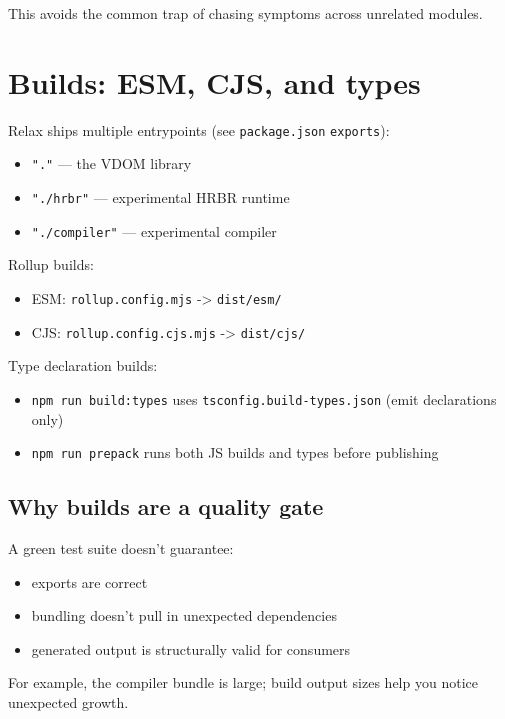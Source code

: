 This avoids the common trap of chasing symptoms across unrelated modules.

\section{Builds: ESM, CJS, and types}

Relax ships multiple entrypoints (see \texttt{package.json} \texttt{exports}):

\begin{itemize}
\item \texttt{"."} --- the VDOM library
\item \texttt{"./hrbr"} --- experimental HRBR runtime
\item \texttt{"./compiler"} --- experimental compiler
\end{itemize}

Rollup builds:

\begin{itemize}
\item ESM: \texttt{rollup.config.mjs} -> \texttt{dist/esm/}
\item CJS: \texttt{rollup.config.cjs.mjs} -> \texttt{dist/cjs/}
\end{itemize}

Type declaration builds:

\begin{itemize}
\item \texttt{npm run build:types} uses \texttt{tsconfig.build-types.json} (emit declarations only)
\item \texttt{npm run prepack} runs both JS builds and types before publishing
\end{itemize}

\subsection{Why builds are a quality gate}

A green test suite doesn't guarantee:

\begin{itemize}
\item exports are correct
\item bundling doesn't pull in unexpected dependencies
\item generated output is structurally valid for consumers
\end{itemize}

For example, the compiler bundle is large; build output sizes help you notice unexpected growth.

